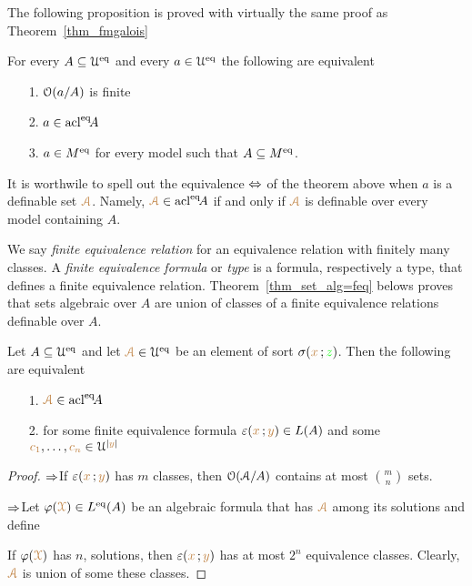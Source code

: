 The following proposition is proved with virtually the same proof as Theorem~\ref{thm_fmgalois}

\begin{theorem}\label{thm_Galois_alg=alg}
For every $A\subseteq\EuScript U^{{\rm eq}}$ and every $a\in\EuScript U^{{\rm eq}}$ the following are equivalent
\begin{itemize}
\item[1.] $\EuScript O(a/A)$ is finite
\item[2.] $a\in{\rm acl}^{{\rm eq}}\!A$
\item[3.] $a\in M^{{\rm eq}}$ for every model such that $A\subseteq M^{{\rm eq}}$.
\end{itemize}
\end{theorem}

It is worthwile to spell out the equivalence $\Leftrightarrow$ of the theorem above when $a$ is a definable set ${\color{brown}\EuScript A}$.
Namely, ${\color{brown}\EuScript A}\in{\rm acl}^{{\rm eq}}\!A$ if and only if ${\color{brown}\EuScript A}$ is definable over every model containing $A$.

We say \emph{finite equivalence relation\/} for an equivalence relation with finitely many classes.
A \emph{finite equivalence formula\/} or \emph{type\/} is a formula, respectively a type, that defines a finite equivalence relation.
Theorem~\ref{thm_set_alg=feq} belows proves that sets algebraic over $A$ are union of classes of a finite equivalence relations definable over $A$.


\begin{theorem}\label{thm_set_alg=feq}
Let $A\subseteq\EuScript U^{{\rm eq}}$ and let ${\color{brown}\EuScript A}\in\EuScript U^{{\rm eq}}$ be an element of sort $\sigma({\color{brown} x}\,;{\color{green} z})$.
Then the following are equivalent
\begin{itemize}
\item[1.] ${\color{brown}\EuScript A}\in{\rm acl}^{{\rm eq}}\!A$
\item[2.] for some finite equivalence formula $\varepsilon({\color{brown} x}\,;{\color{brown} y})\in L(A)$ and some ${\color{brown} c_1},\dots,{\color{brown} c_n}\in\EuScript U^{|{\color{brown} y}|}$
\end{itemize}


\end{theorem}
\begin{proof} $\Rightarrow$\quad If  $\varepsilon({\color{brown} x}\,;{\color{brown} y})$ has $m$ classes, then $\EuScript O(\EuScript A/A)$ contains at most $\displaystyle\binom{m}{n}$ sets.

$\Rightarrow$\quad Let $\varphi({\color{brown}\EuScript X})\in L^{{\rm eq}}(A)$ be an algebraic formula that has ${\color{brown}\EuScript A}$ among its solutions and define


If $\varphi({\color{brown}\EuScript X})$ has $n$, solutions, then $\varepsilon({\color{brown} x}\,;{\color{brown} y})$ has at most $2^n$ equivalence classes.
Clearly, ${\color{brown}\EuScript A}$ is union of some these classes.
\end{proof}


